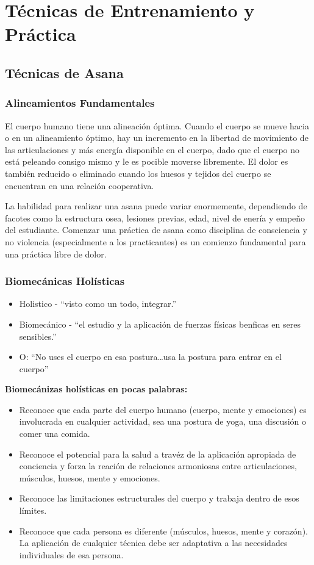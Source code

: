 \chapter{Técnicas de Entrenamiento y Práctica}
\section{Técnicas de Asana}
\subsection{Alineamientos Fundamentales}
El cuerpo humano tiene una alineación óptima. Cuando el cuerpo se mueve hacia o en un alineamiento óptimo, hay un incremento en la libertad de movimiento de las articulaciones y más energía disponible en el cuerpo, dado que el cuerpo no está peleando consigo mismo y le es pocible moverse libremente. El dolor es tambi\'en reducido o eliminado cuando los huesos y tejidos del cuerpo se encuentran en una relación cooperativa.

La habilidad para realizar una asana puede variar enormemente, dependiendo de facotes como la estructura osea, lesiones previas, edad, nivel de enería y empeño del estudiante. Comenzar una práctica de asana como disciplina de consciencia y no violencia (especialmente a los practicantes) es un comienzo fundamental para una práctica libre de dolor.


\subsection{Biomecánicas Holísticas}
\begin{itemize}
	\item Holistico - ``visto como un todo, integrar.''
	\item Biomecánico - ``el estudio y la aplicación de fuerzas físicas benficas en seres sensibles.''
	\item O: ``No uses el cuerpo en esa postura\ldots usa la postura para entrar en el cuerpo''
\end{itemize}

\textbf{Biomecánizas holísticas en pocas palabras:}
\begin{itemize}
	\item Reconoce que cada parte del cuerpo humano (cuerpo, mente y emociones) es involucrada en cualquier actividad, sea una postura de yoga, una discusión o comer una comida.
	\item Reconoce el potencial para la salud a trav\'ez de la aplicación apropiada de conciencia y forza la reación de relaciones armoniosas entre articulaciones, músculos, huesos, mente y emociones.
	\item Reconoce las limitaciones estructurales del cuerpo y trabaja dentro de esos límites.
	\item Reconoce que cada persona es diferente (músculos, huesos, mente y corazón). La aplicación de cualquier t\'ecnica debe ser adaptativa a las necesidades individuales de esa persona.
\end{itemize}

